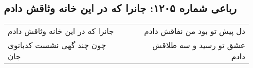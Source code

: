 \begin{center}
\section*{رباعی شماره ۱۲۰۵: جانرا که در این خانه وثاقش دادم}
\label{sec:1205}
\begin{longtable}{l p{0.5cm} r}
جانرا که در این خانه وثاقش دادم
&&
دل پیش تو بود من نفاقش دادم
\\
چون چند گهی نشست کدبانوی جان
&&
عشق تو رسید و سه طلاقش دادم
\\
\end{longtable}
\end{center}
